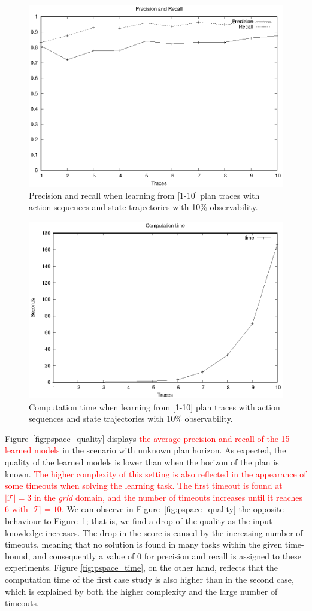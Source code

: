 \begin{figure}[hbt!]
	\centering
	\includegraphics[width=0.65\linewidth]{figures/input_size_100_10_precision.eps}
	\caption{Precision and recall when learning from [1-10] plan traces with \FO action sequences and \PO state trajectories with 10\% observability.}
	\label{fig:np_quality}
\end{figure}

\begin{figure}[hbt!]
	\centering
	\includegraphics[width=0.65\linewidth]{figures/input_size_100_10_time.eps}
	\caption{Computation time when learning from [1-10] plan traces with \FO action sequences and \PO state trajectories with 10\% observability.}
	\label{fig:np_time}
\end{figure}

Figure~\ref{fig:pspace_quality} displays \textcolor{red}{the average precision and recall of the 15 learned models} in the scenario with unknown plan horizon. As expected, the quality of the learned models is lower than when the horizon of the plan is known. \textcolor{red}{The higher complexity of this setting is also reflected in the appearance of some timeouts when solving the learning task. The first timeout is found at $|\mathcal{T}| = 3$ in the \emph{grid} domain, and the number of timeouts increases until it reaches 6 with $|\mathcal{T}| = 10$.} We can observe in Figure~\ref{fig:pspace_quality} the opposite behaviour to Figure~\ref{fig:np_quality}; that is, we find a drop of the quality as the input knowledge increases. The drop in the score is caused by the increasing number of timeouts, meaning that no solution is found in many tasks within the given time-bound, and consequently a value of $0$ for precision and recall is assigned to these experiments. Figure \ref{fig:pspace_time}, on the other hand, reflects that the computation time of the first case study is also higher than in the second case, which is explained by both the higher complexity and the large number of timeouts.


